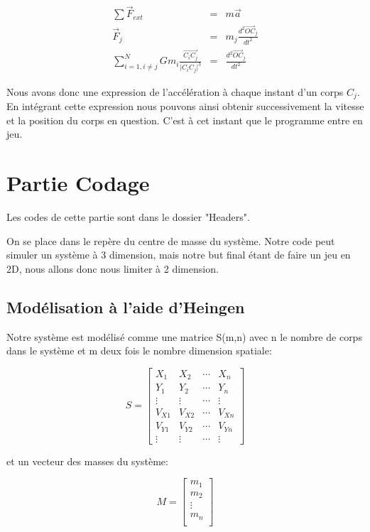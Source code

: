 \documentclass[a4paper]{article}
\begin{document}
\begin{eqnarray}
    \sum \overrightarrow{F}_{ext} &=& m\overrightarrow{a} \\
          \overrightarrow{F}_{j}  &=& m_{j}\frac{d^{2}\overrightarrow{OC}_{j}}{dt^{2}} \\
          \sum_{i=1,i \ne j}^{N} Gm_{i}\frac{\overrightarrow{C_{i}C_{j}}}{{|C_{i}C_{j}}|^3} &=& \frac{d^{2}\overrightarrow{OC}_{j}}{dt^{2}}
\end{eqnarray}

Nous avons donc une expression de l'accélération à chaque instant d'un corps $C_{j}$. En intégrant cette expression nous pouvons ainsi obtenir successivement la vitesse et la position du corps en question. C'est à cet instant que le programme entre en jeu.

\section{Partie Codage}
\label{sec:Partie Codage}

Les codes de cette partie sont dans le dossier "Headers".
\newline

On se place dans le repère du centre de masse du système. Notre code peut simuler un système à 3 dimension, mais notre but final étant de faire un jeu en 2D, nous allons donc nous limiter à 2 dimension.


\subsection{Modélisation à l'aide d'Heingen}

Notre système est modélisé comme une matrice S(m,n) avec n le nombre de corps dans le système et m deux fois le nombre dimension spatiale:

$$S = \left[\begin{matrix}
    X_1 & X_2 & \cdots & X_n\\
    Y_1 & Y_2 & \cdots & Y_n\\
    \vdots & \vdots &\cdots & \vdots\\
    V_{X1} & V_{X2} & \cdots & V_{Xn}\\
    V_{Y1} & V_{Y2} & \cdots & V_{Yn}\\
    \vdots & \vdots &\cdots & \vdots
\end{matrix}\right]$$

et un vecteur des masses du système:

$$M = \left[\begin{matrix}
    m_1 \\
    m_2 \\
    \vdots \\
    m_n\\
\end{matrix}\right]$$
\end{document}
